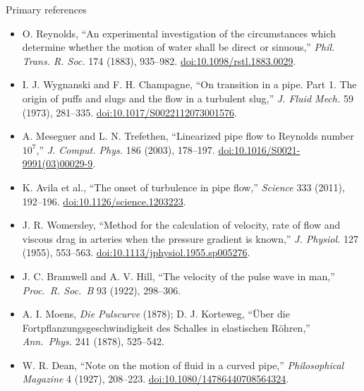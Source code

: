 \documentclass[aspectratio=169,11pt]{beamer}
\begin{document}
\begin{frame}{Primary references}
\scriptsize
\begin{itemize}\itemsep4pt
  \item O. Reynolds, ``An experimental investigation of the circumstances which determine whether the motion of water shall be direct or sinuous,'' \emph{Phil. Trans. R. Soc.} 174 (1883), 935--982. \href{https://doi.org/10.1098/rstl.1883.0029}{doi:10.1098/rstl.1883.0029}.
  \item I. J. Wygnanski and F. H. Champagne, ``On transition in a pipe. Part 1. The origin of puffs and slugs and the flow in a turbulent slug,'' \emph{J. Fluid Mech.} 59 (1973), 281--335. \href{https://doi.org/10.1017/S0022112073001576}{doi:10.1017/S0022112073001576}.
  \item A. Meseguer and L. N. Trefethen, ``Linearized pipe flow to Reynolds number $10^7$,'' \emph{J. Comput. Phys.} 186 (2003), 178--197. \href{https://doi.org/10.1016/S0021-9991(03)00029-9}{doi:10.1016/S0021-9991(03)00029-9}.
  \item K. Avila et al., ``The onset of turbulence in pipe flow,'' \emph{Science} 333 (2011), 192--196. \href{https://doi.org/10.1126/science.1203223}{doi:10.1126/science.1203223}.
  \item J. R. Womersley, ``Method for the calculation of velocity, rate of flow and viscous drag in arteries when the pressure gradient is known,'' \emph{J. Physiol.} 127 (1955), 553--563. \href{https://doi.org/10.1113/jphysiol.1955.sp005276}{doi:10.1113/jphysiol.1955.sp005276}.
  \item J. C. Bramwell and A. V. Hill, ``The velocity of the pulse wave in man,'' \emph{Proc.\ R. Soc.\ B} 93 (1922), 298--306.
  \item A. I. Moens, \emph{Die Pulscurve} (1878); D. J. Korteweg, ``\"Uber die Fortpflanzungsgeschwindigkeit des Schalles in elastischen R\"ohren,'' \emph{Ann.\ Phys.} 241 (1878), 525--542.
  \item W. R. Dean, ``Note on the motion of fluid in a curved pipe,'' \emph{Philosophical Magazine} 4 (1927), 208--223. \href{https://doi.org/10.1080/14786440708564324}{doi:10.1080/14786440708564324}.
\end{itemize}
\end{frame}
\end{document}
